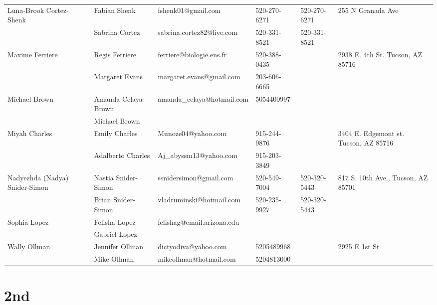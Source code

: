 \documentclass[landscape]{article}\usepackage[]{graphicx}\usepackage[]{color}
\begin{document}
\begin{longtable}{|p{100pt}|p{100pt}|p{140pt}|p{60pt}|p{64pt}|p{120pt}|}
\hline
\multirow{2}{100pt}{Luna-Brook Cortez-Shenk} & Fabian Shenk & fshenk01@gmail.com & 520-270-6271 & 520-270-6271 & \multirow{2}{120pt}{255 N Granada Ave} \\
 & Sabrina Cortez & sabrina.cortez82@live.com & 520-331-8521 & 520-331-8521 & \\
\hline
\multirow{2}{100pt}{Maxime Ferriere} & Regis Ferriere & ferriere@biologie.ens.fr & 520-388-0435 &  & \multirow{2}{120pt}{2938 E. 4th St. Tucson, AZ 85716} \\
 & Margaret Evans & margaret.evans@gmail.com & 203-606-6665 &  & \\
\hline
\multirow{2}{100pt}{Michael Brown} & Amanda Celaya-Brown & amanda\_celaya@hotmail.com & 5054400997 &  & \multirow{2}{120pt}{} \\
 & Michael Brown &  &  &  & \\
\hline
\multirow{2}{100pt}{Miyah Charles} & Emily Charles & Munoze04@yahoo.com & 915-244-9876 &  & \multirow{2}{120pt}{3404 E. Edgemont st. Tucson, AZ 85716} \\
 & Adalberto Charles & Aj\_abyssm13@yahoo.com & 915-203-3849 &  & \\
\hline
\multirow{2}{100pt}{Nadyezhda (Nadya) Snider-Simon} & Nastia Snider-Simon & ssnidersimon@gmail.com & 520-549-7004 & 520-320-5443 & \multirow{2}{120pt}{817 S. 10th Ave., Tucson, AZ 85701} \\
 & Brian Snider-Simon & vladruminski@hotmail.com & 520-235-9927 & 520-320-5443 & \\
\hline
\multirow{2}{100pt}{Sophia Lopez} & Felisha Lopez & felishag@email.arizona.edu &  &  & \multirow{2}{120pt}{} \\
 & Gabriel Lopez &  &  &  & \\
\hline
\multirow{2}{100pt}{Wally Ollman} & Jennifer Ollman & dictyodiva@yahoo.com & 5205489968 &  & \multirow{2}{120pt}{2925 E 1st St} \\
 & Mike Ollman & mikeollman@hotmail.com & 5204813000 &  & \\
\hline
\end{longtable}
\newpage
\section{2nd}
\end{document}
